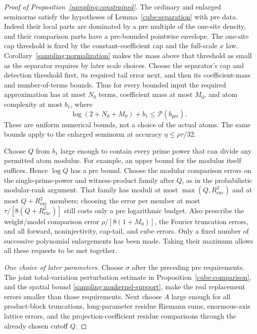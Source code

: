 \begin{proof}[Proof of Proposition~\ref{sampling:constrained}]
The ordinary and enlarged seminorms satisfy the hypotheses of
Lemma~\ref{cube:separation} with pre data.  Indeed their local parts
are dominated by a pre multiple of the one-site density, and their
comparison parts have a pre-bounded pointwise envelope.  The one-site
cap threshold is fixed by the constant-coefficient cap and the full-scale
$x$ law.  Corollary~\ref{sampling:normalization} makes the mass above
that threshold as small as the separator requires by later scale choices.
Choose the separator's cap and detection threshold first, its required
tail error next, and then its coefficient-mass and number-of-terms bounds.
Thus for every bounded input the required approximation has at most
$N_0$ terms, coefficient mass at most $M_0$, and atom complexity at most
$b_1$, where
\[
 \log(2+N_0+M_0)+b_1\le\mathcal P(b_{\mathrm{pre}}).
\]
These are uniform numerical bounds, not a choice of the actual atoms.
The same bounds apply to the enlarged seminorm at accuracy
$\eta\le\rho\tau/32$.

Choose $Q$ from $b_1$ large enough to contain every prime power that
can divide any permitted atom modulus.  For example, an upper bound
for the modulus itself suffices.  Hence $\log Q$ has a pre bound.
Choose the modular comparison errors on the single-prime-power and
witness-product family after $Q$, as in the probabilistic modular-rank
argument.  That family has moduli at most
$\max(Q,R_{\mathrm{exc}}^2)$ and at most
$Q+R_{\mathrm{exc}}^2$ members; choosing the error per member at most
$\tau/[8(Q+R_{\mathrm{exc}}^2)]$ still costs only a pre logarithmic
budget.  Also prescribe the weight/model comparison error
$\rho/[8(1+M_0)]$, the Fourier truncation errors, and all forward,
noninjectivity, cap-tail, and cube errors.  Only a fixed number of
successive polynomial enlargements has been made.  Taking their maximum
allows all these requests to be met together.

\emph{One choice of later parameters.}
Choose $\sigma$ after the preceding pre requirements.  The joint
total-variation perturbation estimate in
Proposition~\ref{cube:comparison}, and the spatial bound
\eqref{sampling:nonkernel-support}, make the real replacement errors
smaller than those requirements.  Next choose $A$ large enough for all
product-block truncations, long-parameter residue Riemann sums,
enormous-axis lattice errors, and the projection-coefficient residue
comparisons through the already chosen cutoff $Q$.


\end{proof}
